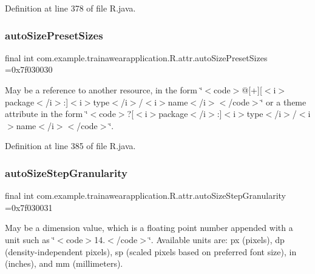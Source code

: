 Definition at line 378 of file R.\+java.

\mbox{\label{classcom_1_1example_1_1trainawearapplication_1_1_r_1_1attr_a6e119c39697ac3179214fbf41f0ee076}} 
\subsubsection{\texorpdfstring{autoSizePresetSizes}{autoSizePresetSizes}}
{\footnotesize\ttfamily final int com.\+example.\+trainawearapplication.\+R.\+attr.\+auto\+Size\+Preset\+Sizes =0x7f030030\hspace{0.3cm}{\ttfamily [static]}}

May be a reference to another resource, in the form \char`\"{}$<$code$>$@\mbox{[}+\mbox{]}\mbox{[}$<$i$>$package$<$/i$>$\+:\mbox{]}$<$i$>$type$<$/i$>$/$<$i$>$name$<$/i$>$$<$/code$>$\char`\"{} or a theme attribute in the form \char`\"{}$<$code$>$?\mbox{[}$<$i$>$package$<$/i$>$\+:\mbox{]}$<$i$>$type$<$/i$>$/$<$i$>$name$<$/i$>$$<$/code$>$\char`\"{}. 

Definition at line 385 of file R.\+java.

\mbox{\label{classcom_1_1example_1_1trainawearapplication_1_1_r_1_1attr_a671d60e3fdae4d16132de51b223a35b5}} 
\subsubsection{\texorpdfstring{autoSizeStepGranularity}{autoSizeStepGranularity}}
{\footnotesize\ttfamily final int com.\+example.\+trainawearapplication.\+R.\+attr.\+auto\+Size\+Step\+Granularity =0x7f030031\hspace{0.3cm}{\ttfamily [static]}}

May be a dimension value, which is a floating point number appended with a unit such as \char`\"{}$<$code$>$14.\+5sp$<$/code$>$\char`\"{}. Available units are\+: px (pixels), dp (density-\/independent pixels), sp (scaled pixels based on preferred font size), in (inches), and mm (millimeters). 

